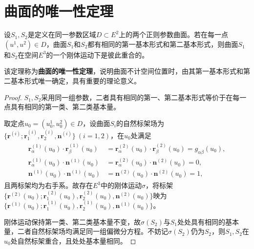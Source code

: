 \documentclass[../../main.tex]{subfiles}%
\begin{document}
\section{曲面的唯一性定理}

\begin{theorem}
设$S_1,S_2$是定义在同一参数区域$D \subset E^2$上的两个正则参数曲面。若在每一点$(u^1,u^2) \in D$，曲面$S_1$和$S_2$都有相同的第一基本形式和第二基本形式，则曲面$S_1$和$S_2$在空间$E^3$的一个刚体运动下是彼此重合的。
\end{theorem}

\begin{remark}
该定理称为\textbf{曲面的唯一性定理}，说明曲面不计空间位置时，由其第一基本形式和第二基本形式唯一确定，具有重要的理论意义。
\end{remark}

\begin{proof}

$S_1,S_2$采用同一组参数，二者具有相同的第一、第二基本形式等价于在每一点具有相同的第一类、第二类基本量。

取定点$u_0=(u_0^1,u_0^2) \in D$，设曲面$S_i$的自然标架场为$\{\boldsymbol{r}^{(i)};\boldsymbol{r}_1^{(i)},\boldsymbol{r}_2^{(i)},\boldsymbol{n}^{(i)}\}\ (i=1,2)$，在$u_0$处满足
\begin{align}
\begin{split}
\boldsymbol{r}_\alpha^{(1)}(u_0) \cdot \boldsymbol{r}_\beta^{(1)}(u_0) &= \boldsymbol{r}_\alpha^{(2)}(u_0) \cdot \boldsymbol{r}_\beta^{(2)}(u_0) = g_{\alpha\beta}(u_0),\\
\boldsymbol{r}_\alpha^{(1)}(u_0) \cdot \boldsymbol{n}^{(1)}(u_0) &= \boldsymbol{r}_\alpha^{(2)}(u_0) \cdot \boldsymbol{n}^{(2)}(u_0) = 0,\\
\boldsymbol{n}^{(1)}(u_0) \cdot \boldsymbol{n}^{(1)}(u_0) &= \boldsymbol{n}^{(2)}(u_0) \cdot \boldsymbol{n}^{(2)}(u_0) = 1,
\end{split}
\label{eq:::IOJIOWAIJ2.1}
\end{align}
且两标架均为右手系。故存在$E^3$中的刚体运动$\sigma$，将标架$\{\boldsymbol{r}^{(2)}(u_0);\boldsymbol{r}_1^{(2)}(u_0),\boldsymbol{r}_2^{(2)}(u_0),\boldsymbol{n}^{(2)}(u_0)\}$映为$\{\boldsymbol{r}^{(1)}(u_0);\boldsymbol{r}_1^{(1)}(u_0),\boldsymbol{r}_2^{(1)}(u_0),\boldsymbol{n}^{(1)}(u_0)\}$。

刚体运动保持第一类、第二类基本量不变，故$\sigma(S_2)$与$S_1$处处具有相同的基本量，二者自然标架场均满足同一组偏微分方程。不妨记$\sigma(S_2)$仍为$S_2$，则$S_1,S_2$在$u_0$处自然标架重合，且处处基本量相同。


\end{proof}
\end{document}
